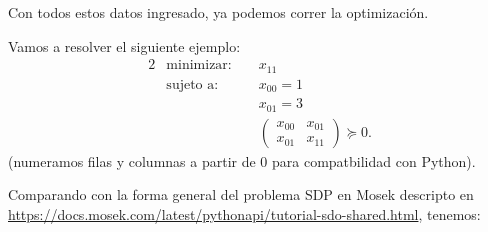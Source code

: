 \documentclass[11pt]{article}
\begin{document}
Con todos estos datos ingresado, ya podemos correr la optimización.





Vamos a resolver el siguiente ejemplo:
\begin{alignat*}{2}
  & \text{minimizar: } & & x_{11} \\
  & \text{sujeto a: } & & x_{00} = 1 \\
  & & & x_{01} = 3 \\
  & & & \begin{pmatrix} x_{00} & x_{01} \\ x_{01} & x_{11} \end{pmatrix} \succeq 0.
\end{alignat*}
(numeramos filas y columnas a partir de 0 para compatbilidad con Python).

Comparando con la forma general del problema SDP en Mosek descripto en \url{https://docs.mosek.com/latest/pythonapi/tutorial-sdo-shared.html}, tenemos:
\end{document}
